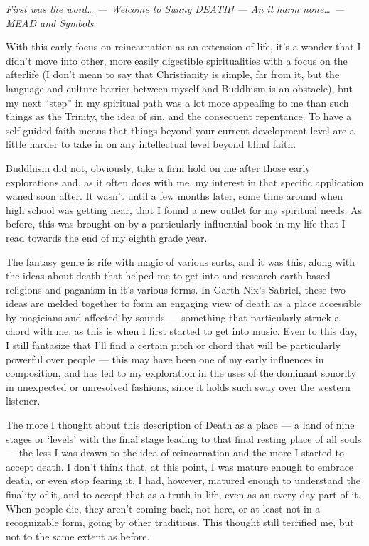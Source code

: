 \emph{First was the word\ldots{} --- Welcome to Sunny DEATH! --- An it harm none\ldots{} --- MEAD and Symbols}

With this early focus on reincarnation as an extension of life, it's a wonder that I didn't move into other, more easily digestible spiritualities with a focus on the afterlife (I don't mean to say that Christianity is simple, far from it, but the language and culture barrier between myself and Buddhism is an obstacle), but my next ``step'' in my spiritual path was a lot more appealing to me than such things as the Trinity, the idea of sin, and the consequent repentance. To have a self guided faith means that things beyond your current development level are a little harder to take in on any intellectual level beyond blind faith.

Buddhism did not, obviously, take a firm hold on me after those early explorations and, as it often does with me, my interest in that specific application waned soon after. It wasn't until a few months later, some time around when high school was getting near, that I found a new outlet for my spiritual needs. As before, this was brought on by a particularly influential book in my life that I read towards the end of my eighth grade year.

The fantasy genre is rife with magic of various sorts, and it was this, along with the ideas about death that helped me to get into and research earth based religions and paganism in it's various forms. In Garth Nix's Sabriel, these two ideas are melded together to form an engaging view of death as a place accessible by magicians and affected by sounds --- something that particularly struck a chord with me, as this is when I first started to get into music. Even to this day, I still fantasize that I'll find a certain pitch or chord that will be particularly powerful over people --- this may have been one of my early influences in composition, and has led to my exploration in the uses of the dominant sonority in unexpected or unresolved fashions, since it holds such sway over the western listener.

The more I thought about this description of Death as a place --- a land of nine stages or `levels' with the final stage leading to that final resting place of all souls --- the less I was drawn to the idea of reincarnation and the more I started to accept death. I don't think that, at this point, I was mature enough to embrace death, or even stop fearing it. I had, however, matured enough to understand the finality of it, and to accept that as a truth in life, even as an every day part of it. When people die, they aren't coming back, not here, or at least not in a recognizable form, going by other traditions. This thought still terrified me, but not to the same extent as before.

